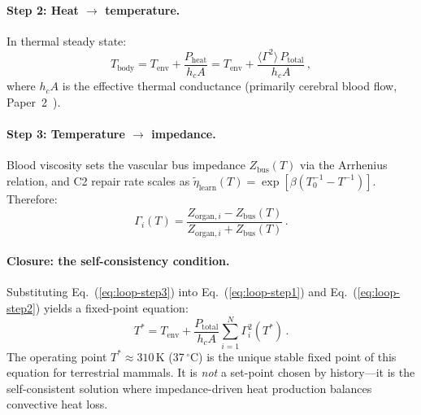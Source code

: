 \documentclass[aps,pre,twocolumn,superscriptaddress,floatfix]{revtex4-2}
\begin{document}
\paragraph{Step 2: Heat $\to$ temperature.}
In thermal steady state:
\begin{equation}
  T_{\mathrm{body}} = T_{\mathrm{env}}
  + \frac{P_{\mathrm{heat}}}{h_c A}
  = T_{\mathrm{env}}
  + \frac{\langle \Gamma^2 \rangle \, P_{\mathrm{total}}}{h_c A}\,,
  \label{eq:loop-step2}
\end{equation}
where $h_c A$ is the effective thermal conductance
(primarily cerebral blood flow, Paper~2~\cite{Paper2}).

\paragraph{Step 3: Temperature $\to$ impedance.}
Blood viscosity sets the vascular bus impedance
$Z_{\mathrm{bus}}(T)$ via the Arrhenius relation,
and C2 repair rate scales as
$\tilde{\eta}_{\mathrm{learn}}(T)
= \exp[\beta(T_0^{-1} - T^{-1})]$.
Therefore:
\begin{equation}
  \Gamma_i(T) = \frac{Z_{\mathrm{organ},i} - Z_{\mathrm{bus}}(T)}
  {Z_{\mathrm{organ},i} + Z_{\mathrm{bus}}(T)}\,.
  \label{eq:loop-step3}
\end{equation}

\paragraph{Closure: the self-consistency condition.}
Substituting Eq.~(\ref{eq:loop-step3}) into
Eq.~(\ref{eq:loop-step1}) and Eq.~(\ref{eq:loop-step2})
yields a fixed-point equation:
\begin{equation}
  \boxed{T^* = T_{\mathrm{env}}
  + \frac{P_{\mathrm{total}}}{h_c A}
  \sum_{i=1}^{N} \Gamma_i^2(T^*)\,.}
  \label{eq:loop-closure}
\end{equation}
The operating point $T^* \approx 310$\,K (37$\,^\circ$C)
is the unique stable fixed point of this equation
for terrestrial mammals.
It is \emph{not} a set-point chosen by history---it is
the self-consistent solution where impedance-driven
heat production balances convective heat loss.
\end{document}
